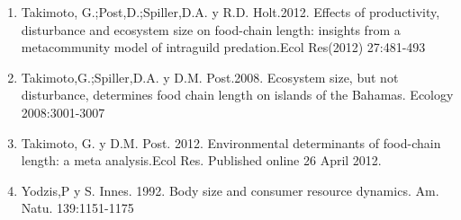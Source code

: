 \documentclass[a4paper,11pt]{article}
\begin{document}
\begin{enumerate}
\item Takimoto, G.;Post,D.;Spiller,D.A. y R.D. Holt.2012. Effects of productivity, disturbance and ecosystem size on food-chain length: insights from a metacommunity model of intraguild predation.Ecol Res(2012) 27:481-493\\
\item Takimoto,G.;Spiller,D.A. y D.M. Post.2008. Ecosystem size, but not disturbance, determines food chain length on islands of the Bahamas. Ecology 2008:3001-3007\\
\item Takimoto, G. y D.M. Post. 2012. Environmental determinants of food-chain length: a meta analysis.Ecol Res. Published online 26 April 2012.\\
\item Yodzis,P y S. Innes. 1992. Body size and consumer resource dynamics. Am. Natu. 139:1151-1175\\
\end{enumerate}
\end{document}
